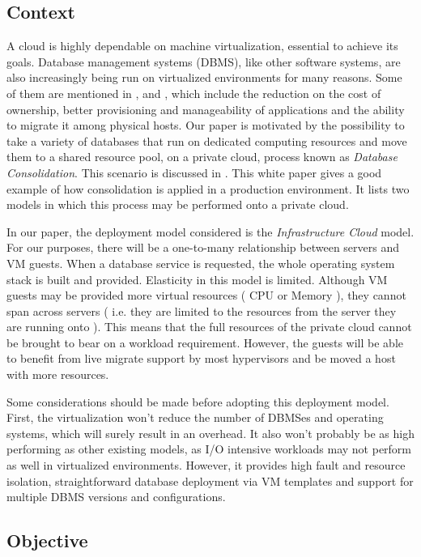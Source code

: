 \subsection{Context}

A cloud is highly dependable on machine virtualization, essential to achieve its goals. Database management systems (DBMS), like other software systems, are also increasingly being run on virtualized environments for many reasons. Some of them are mentioned in \cite{4498282}, \cite{4401021} and \cite{Soror:2008:AVM:1376616.1376711}, which include the reduction on the cost of ownership, better provisioning and manageability of applications and the ability to migrate it among physical hosts. Our paper is motivated by the possibility to take a variety of databases that run on dedicated computing resources and move them to a shared resource pool, on a private cloud, process known as \textit{Database Consolidation}. This scenario is discussed in \cite{instance1290}. This white paper gives a good example of how consolidation is applied in a production environment. It lists two models in which this process may be performed onto a private cloud. 

In our paper, the deployment model considered is the \textit{Infrastructure Cloud} model. For our purposes, there will be a one-to-many relationship between servers and VM guests. When a database service is requested, the whole operating system stack is built and provided. Elasticity in this model is limited. Although VM guests may be provided more virtual resources ( CPU or Memory ), they cannot span across servers ( i.e. they are limited to the resources from the server they are running onto ). This means that the full resources of the private cloud cannot be brought to bear on a workload requirement. However, the guests will be able to benefit from live migrate support by most hypervisors and be moved a host with more resources. 

Some considerations should be made before adopting this deployment model. First, the virtualization won't reduce the number of DBMSes and operating systems, which will surely result in an overhead. It also won't probably be as high performing as other existing models, as I/O intensive workloads may not perform as well in virtualized environments. However, it provides high fault and resource isolation, straightforward database deployment via VM templates and  support for multiple DBMS versions and configurations.


\subsection{Objective}

